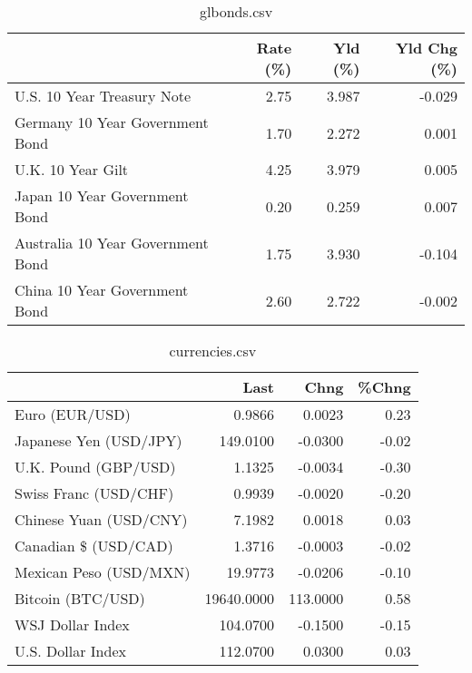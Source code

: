 \documentclass{article}%
\begin{document}
%


\begin{table}[htbp]%
\caption{glbonds.csv}%
\centering%
\begin{adjustbox}{width=1\textwidth}%
\begin{tabular}{lrrr}
\toprule
                                  &  Rate (\%) &  Yld (\%) &  Yld Chg (\%) \\
\midrule
       U.S. 10 Year Treasury Note &      2.75 &    3.987 &       -0.029 \\
  Germany 10 Year Government Bond &      1.70 &    2.272 &        0.001 \\
                U.K. 10 Year Gilt &      4.25 &    3.979 &        0.005 \\
    Japan 10 Year Government Bond &      0.20 &    0.259 &        0.007 \\
Australia 10 Year Government Bond &      1.75 &    3.930 &       -0.104 \\
    China 10 Year Government Bond &      2.60 &    2.722 &       -0.002 \\
\bottomrule
\end{tabular}
%
\end{adjustbox}%
\end{table}

%


\begin{table}[htbp]%
\caption{currencies.csv}%
\centering%
\begin{adjustbox}{width=1\textwidth}%
\begin{tabular}{lrrr}
\toprule
                       &       Last &     Chng &  \%Chng \\
\midrule
        Euro (EUR/USD) &     0.9866 &   0.0023 &   0.23 \\
Japanese Yen (USD/JPY) &   149.0100 &  -0.0300 &  -0.02 \\
  U.K. Pound (GBP/USD) &     1.1325 &  -0.0034 &  -0.30 \\
 Swiss Franc (USD/CHF) &     0.9939 &  -0.0020 &  -0.20 \\
Chinese Yuan (USD/CNY) &     7.1982 &   0.0018 &   0.03 \\
  Canadian \$ (USD/CAD) &     1.3716 &  -0.0003 &  -0.02 \\
Mexican Peso (USD/MXN) &    19.9773 &  -0.0206 &  -0.10 \\
     Bitcoin (BTC/USD) & 19640.0000 & 113.0000 &   0.58 \\
      WSJ Dollar Index &   104.0700 &  -0.1500 &  -0.15 \\
     U.S. Dollar Index &   112.0700 &   0.0300 &   0.03 \\
\bottomrule
\end{tabular}
%
\end{adjustbox}%
\end{table}

%
\end{document}
